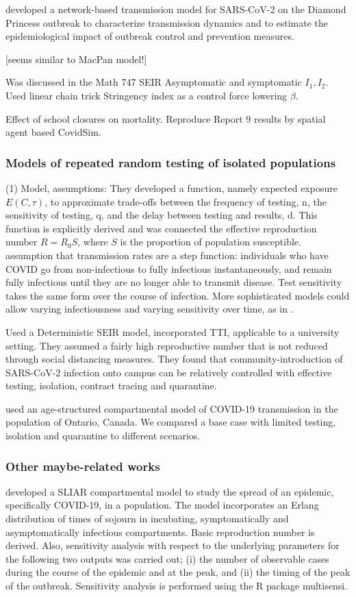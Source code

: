 \documentclass{article}
\theoremstyle{definition} %
\begin{document}
\citep{jenness2020modeling} developed a network-based transmission model for SARS-CoV-2 on the Diamond Princess outbreak to characterize transmission dynamics and to estimate the epidemiological impact of outbreak control and prevention measures. 

\citep{elbanna2020entry} [seems similar to MacPan model!]

\citep{de2020influenza} Was discussed in the Math 747 
SEIR Asymptomatic and symptomatic $I_1, I_2$. Used linear chain trick 
Stringency index as a control force lowering $\beta$.

\citep{rice2020effect} Effect of school closures on mortality. Reproduce Report 9 results by spatial agent based CovidSim. 
\subsubsection{Models of repeated random testing of isolated populations}
\cite{bergstrom2020frequency}
(1) Model, assumptions: They developed a function, namely expected exposure $E(C,\tau)$, to approximate trade-offs between the frequency of testing, n, the sensitivity of testing, q, and the delay between
testing and results, d. This function is explicitly derived and was connected the effective reproduction number $R=R_0 S$, where $S$ is the proportion of population susceptible.
assumption that transmission rates are a step function: individuals who
have COVID go from non-infectious to fully infectious instantaneously,
and remain fully infectious until they are no longer able to transmit disease. Test sensitivity takes the same form over the course of infection.
More sophisticated models could allow varying infectiousness and varying
sensitivity over time, as in 
\citep{larremore2020test}.

\citep{lopman2020model} Used a Deterministic SEIR model, incorporated TTI, applicable to a university setting. They assumed a fairly high reproductive number that is not reduced through social
distancing measures. They found that community-introduction of SARS-CoV-2 infection onto campus can be
relatively controlled with effective testing, isolation, contract tracing and quarantine.

\citep{tuite2020mathematical} used an age-structured compartmental model of COVID-19 transmission in the population of Ontario, Canada. We compared a base case with limited testing, isolation and quarantine to different scenarios. 
\subsubsection{Other maybe-related works}
\citep{arino2020simple} developed a SLIAR compartmental model to study the spread of an epidemic, specifically COVID-19, in a population. The model incorporates an Erlang distribution of times of sojourn in incubating, symptomatically and asymptomatically infectious compartments. Basic reproduction number is derived. Also, sensitivity analysis with respect to the underlying parameters for the following two outputs was carried out; (i) the number of observable cases during the course of the epidemic and at the peak, and (ii) the timing of the peak of the outbreak. Sensitivity analysis is performed using the R package multisensi.
\end{document}

